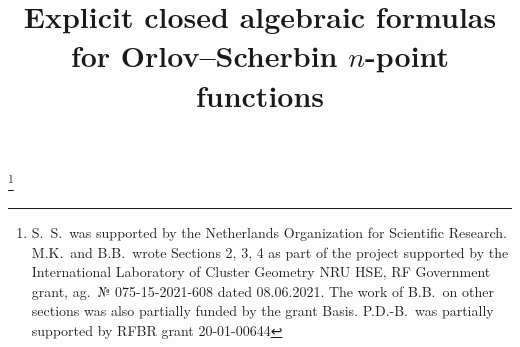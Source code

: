 \documentclass[JEP,XML,SOM,Unicode,NoEqCountersInSection,NoFloatCountersInSection]{cedram}
\theoremstyle{plain}
\theoremstyle{definition}
\theoremstyle{remark}
\begin{document}
\frontmatter
\title{Explicit closed algebraic formulas for Orlov--Scherbin $n$-point functions}

\author[\initial{B.} \lastname{Bychkov}]{ }
\address{Faculty of Mathematics, National Research University Higher School of Economics\\
Usacheva 6, 119048 Moscow, Russia\\
and\\
Center of Integrable Systems, P.G. Demidov Yaroslavl State University\\
Sovetskaya 14, 150003, Yaroslavl, Russia\\
and current affiliation:\\
Department of Mathematics, University of Haifa\\
Mount Carmel, 3488838, Haifa, Israel}

\author[\initial{P.} \lastname{Dunin-Barkowski}]{ }
\address{Faculty of Mathematics, National Research University Higher School of Economics\\
Usacheva 6, 119048 Moscow, Russia\\
and\\
HSE--Skoltech International Laboratory of Representation Theory and Mathematical Physics, Skoltech\\
Nobelya 1, 143026, Moscow, Russia\\
and\\
NRC ``Kurchatov Institute'' -- ITEP\\
117218 Moscow, Russia}

\author[\initial{M.} \lastname{Kazarian}]{ }
\address{Faculty of Mathematics, National Research University Higher School of Economics\\
Usacheva 6, 119048 Moscow, Russia\\
and\\
Center for Advanced Studies, Skoltech\\
Nobelya 1, 143026, Moscow, Russia}

\author[\initial{S.} \lastname{Shadrin}]{ }
\address{Korteweg-de Vries Institute for Mathematics, University of Amsterdam\\
Postbus 94248, 1090 GE Amsterdam, The Netherlands}

\thanks{S.~S.\ was supported by the Netherlands Organization for Scientific Research. M.K.\ and B.B.\ wrote Sections 2, 3, 4 as part of the project supported by the International Laboratory of Cluster Geometry NRU HSE, RF Government grant, ag.\ № 075-15-2021-608 dated 08.06.2021. The work of B.B.\ on other sections was also partially funded by the grant Basis. P.D.-B.\ was partially supported by RFBR grant 20-01-00644}
\end{document}
